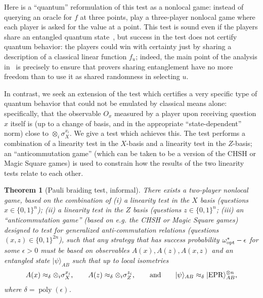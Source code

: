 \documentclass[11pt,letterpaper]{article}
\newcommand{\<}{\langle}
\renewcommand{\>}{\rangle}
\newtheorem{theorem}{Theorem}
\newcommand{\epr}{{\rm EPR}}
\newcommand{\ket}[1]{| #1 \>}
\newcommand{\eps}{\epsilon}
\DeclareMathOperator{\poly}{poly}
\begin{document}
Here is a ``quantum'' reformulation of this test as a nonlocal game:
instead of querying an oracle for $f$ at three points, play a
three-player nonlocal game where each player is asked for the value
at a point. This test is sound even if the players share an entangled quantum
state~\cite{IV12}, but success in the test does not certify quantum behavior:
the players could win with certainty just by sharing a description of
a classical linear function $f_u$; indeed, the main point of the analysis in~\cite{IV12} is precisely to ensure that provers sharing entanglement have no more freedom than to use it as shared randomness in selecting $u$. 

 In contrast, we seek an extension of the test which certifies a very specific type of quantum behavior that could not be emulated by classical means alone: specifically, that the observable $O_x$ measured by a player upon receiving question $x$ itself
is (up to a change of basis, and in the appropriate ``state-dependent'' norm) close to $\otimes_i \sigma_X^{x_i}$.
We give a test which achieves this. The test performs a combination of
a linearity test in the $X$-basis and a linearity test in the
$Z$-basis; an ``anticommutation game'' (which can be taken to be a
version of the CHSH or Magic Square games) is used to constrain how the
results of the two linearity tests relate to each other.


\begin{theorem}[Pauli braiding test, informal]\label{thm:braiding}
  There exists a two-player nonlocal game, based on the combination of
  (i) a linearity test in the $X$ basis (questions $x\in\{0,1\}^n$);
  (ii) a linearity test in the $Z$ basis (questions $z\in\{0,1\}^n$;
  (iii) an ``anticommutation game'' (based on e.g. the CHSH or Magic Square games) designed to test for generalized   anti-commutation relations (questions $(x,z)\in\{0,1\}^{2n}$), such
  that any strategy
  that has success probability $\omega^*_{\rm opt}-\eps$ for some
  $\eps>0$ must be based on observables $A(x),A(z),A(x,z)$ and an
  entangled state $\ket{\psi}_{AB}$ such that up to local isometries
  $$A(x) \approx_{\delta} \otimes_i \sigma_X^{x_i}, \qquad A(z) \approx_{\delta} \otimes_i \sigma_Z^{z_i},\qquad\text{and}
\qquad \ket{\psi}_{AB} \approx_{\delta} \ket{\epr}_{AB}^{\otimes n},$$
where $\delta=\poly(\eps)$. 
\end{theorem}
\end{document}
